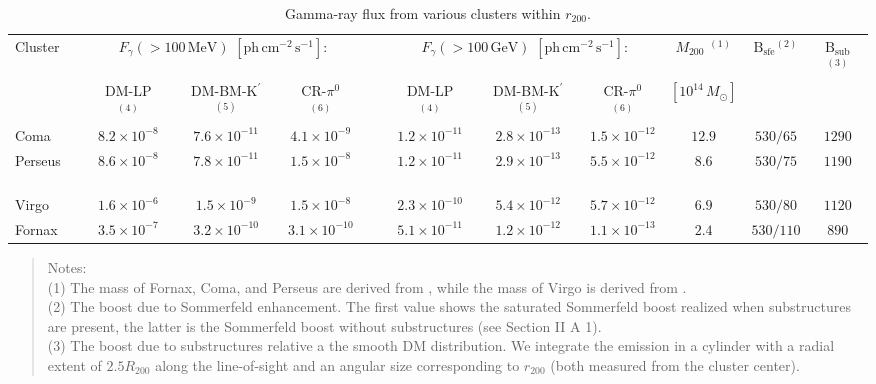 \documentclass[10pt,aps,pra,reprint,amsmath,amsfonts,amssymb,showpacs,nofootinbib,floatfix]{revtex4-1}
\newcommand{\rmn}{\mathrm}
\newcommand{\msun}{M_\odot}
\newcommand{\Kp}{\rmn{K}^\prime}
\newcommand{\B}{\rmn{B}}
\newcommand{\rvir}{r_{200}}
\newcommand{\mvir}{M_{200}}
\begin{document}
\begin{table}
\begin{minipage}{2.0\columnwidth}
  \caption{Gamma-ray flux from various clusters within $\rvir$.}
\begin{tabular}{l c c c c c c c c c c}
\hline
\hline
 Cluster &
\multicolumn{3}{c}{$F_{\gamma}(>100\,\rmn{MeV})$ $[\rmn{ph}\,\rmn{cm}^{-2}\,\rmn{s}^{-1}]$:} & &
\multicolumn{3}{c}{$F_{\gamma}(>100\,\rmn{GeV})$ $[\rmn{ph}\,\rmn{cm}^{-2}\,\rmn{s}^{-1}]$:} &
$\mvir$ $^{(1)}$ & $\B_\rmn{sfe} $$^{(2)}$ & $\B_\rmn{sub} $$^{(3)}$ \\
         & DM-LP $^{(4)}$ & DM-BM-$\Kp$ $^{(5)}$ & CR-$\pi^0$ $^{(6)}$
         & & DM-LP $^{(4)}$ & DM-BM-$\Kp$ $^{(5)}$ & CR-$\pi^0$ $^{(6)}$ & $[10^{14}\,\msun]$ && \\
 \hline
 Coma & $8.2\times10^{-8}$ & $7.6\times10^{-11}$ & $4.1\times10^{-9}$
 & \,\,\,\,\, & $1.2\times10^{-11}$ & $2.8\times10^{-13}$ & $1.5\times10^{-12}$
 & $12.9$ & $530/65$ & $1290$ \\
 Perseus \,\,\,\,\,\, & $8.6\times10^{-8}$ & $7.8\times10^{-11}$ & $1.5\times10^{-8}$
 & \,\,\,\,\, & $1.2\times10^{-11}$ & $2.9\times10^{-13}$ & $5.5\times10^{-12}$
 & $8.6$ & $530/75$ & $1190$ \\
 Virgo & $1.6\times10^{-6}$ & $1.5\times10^{-9}$ & $1.5\times10^{-8}$
 & \,\,\,\,\, & $2.3\times10^{-10}$ & $5.4\times10^{-12}$ & $5.7\times10^{-12}$
 & $6.9$ & $530/80$ & $1120$ \\
 Fornax & $3.5\times10^{-7}$ & $3.2\times10^{-10}$ & $3.1\times10^{-10}$
 & \,\,\,\,\, & $5.1\times10^{-11}$ & $1.2\times10^{-12}$ & $1.1\times10^{-13}$
 & $2.4$ & $530/110$ & $890$ \\
\hline
\hline
\end{tabular}
\begin{quote}
  Notes: \\
  (1) The mass of Fornax, Coma, and Perseus are derived from \cite{2007A&A...466..805C},
  while the mass of Virgo is derived from \cite{1984ApJ...281...31T}.\\
  (2) The boost due to Sommerfeld enhancement. The first value shows the saturated
  Sommerfeld boost realized when substructures are present, the latter is the Sommerfeld
  boost without substructures (see Section II A 1).\\
  (3) The boost due to substructures relative a the smooth DM
  distribution. We integrate the emission in a cylinder with a radial
  extent of $2.5 R_{200}$ along the line-of-sight and an angular size
  corresponding to $\rvir$ (both measured from the cluster center).\\

\end{quote}
\end{minipage}
\end{table}
\end{document}
